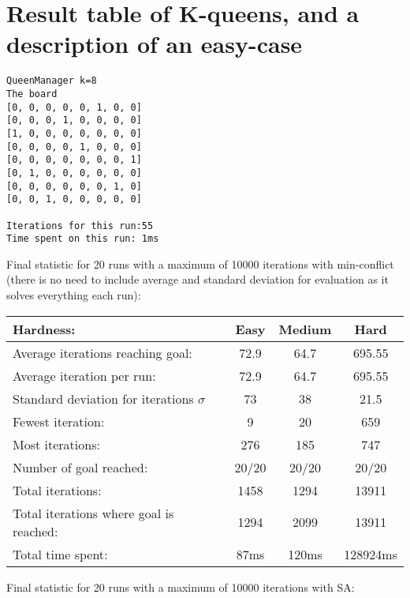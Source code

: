 \documentclass[12pt, a4paper]{article}
\begin{document}
\section{Result table of K-queens, and a description of an easy-case}
\begin{verbatim}
QueenManager k=8
The board 
[0, 0, 0, 0, 0, 1, 0, 0]
[0, 0, 0, 1, 0, 0, 0, 0]
[1, 0, 0, 0, 0, 0, 0, 0]
[0, 0, 0, 0, 1, 0, 0, 0]
[0, 0, 0, 0, 0, 0, 0, 1]
[0, 1, 0, 0, 0, 0, 0, 0]
[0, 0, 0, 0, 0, 0, 1, 0]
[0, 0, 1, 0, 0, 0, 0, 0]

Iterations for this run:55
Time spent on this run: 1ms
\end{verbatim}
\noindent
Final statistic for 20 runs with a maximum of 10000 iterations with min-conflict (there is no need to include average and standard deviation for evaluation as it solves everything each run):\\
\begin{center}
  \begin{tabular}{| l | c c c|}
    \hline
    Hardness: &\textbf{Easy} & \textbf{Medium} & \textbf{Hard} \\ \hline
    Average iterations reaching goal: & 72.9& 64.7 & 695.55\\
    Average iteration per run:  & 72.9 & 64.7 & 695.55\\
    Standard deviation for iterations $\sigma$ & 73 & 38 & 21.5\\
    Fewest iteration: & 9 & 20& 659\\ 
    Most iterations: & 276 & 185& 747\\ 
    Number of goal reached: & 20/20 & 20/20 & 20/20\\
    Total iterations: & 1458 & 1294& 13911\\
    Total iterations where goal is reached: & 1294 & 2099& 13911\\
    Total time spent: & 87ms & 120ms & 128924ms\\
    \hline
  \end{tabular}
\end{center}
\noindent
Final statistic for 20 runs with a maximum of 10000 iterations with SA:\\
\end{document}
